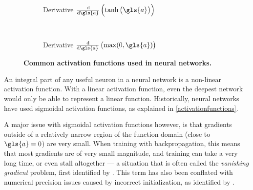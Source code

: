 \documentclass[thesis]{subfiles}
\begin{document}
\begin{figure}[tbp]
\begin{subfigure}[t]{0.48\textwidth}
		\caption{Derivative $\frac{\dif}{\dif\gls{a}} \left(\tanh\left(\gls{a}\right)\right)$}\label{fig:tanhgradients}
	\end{subfigure}
	~
	\begin{subfigure}[t]{0.48\textwidth}
		\caption{Derivative $\frac{\dif}{\dif\gls{a}} \left(\max(0,\gls{a})\right)$}\label{fig:relugradient}
	\end{subfigure}
	\caption[Activation functions]{\textbf{Common activation functions used in neural networks.}}\label{fig:afunctions}
\end{figure}

An integral part of any useful neuron in a neural network is a non-linear activation function. With a linear activation function, even the deepest network would only be able to represent a linear function. Historically, neural networks have used sigmoidal activation functions, as explained in \cref{activationfunctions}.

A major issue with sigmoidal activation functions however, is that gradients outside of a relatively narrow region of the function domain (close to $\gls{a}=0$) are very small. When training with backpropagation, this means that most gradients are of very small magnitude, and training can take a very long time, or even stall altogether --- a situation that is often called the \emph{vanishing gradient} problem, first identified by \citet{hochreiter1991untersuchungen}. This term has also been conflated with numerical precision issues caused by incorrect initialization, as identified by \citet{glorot2010understanding}.
\end{document}
